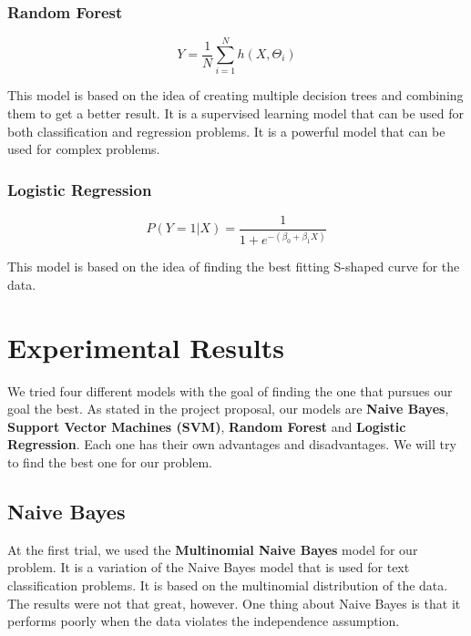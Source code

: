 \documentclass[conference]{IEEEtran}
\begin{document}
\subsubsection{Random Forest}

\begin{equation*}
    Y = \frac{1}{N} \sum_{i=1}^{N} h(X, \Theta_i)
\end{equation*}

This model is based on the idea of creating multiple decision trees and combining them to get a better result. It is a supervised learning model that can be used for both classification and regression problems. It is a powerful model that can be used for complex problems.

\subsubsection{Logistic Regression}

\begin{equation*}
    P(Y=1|X) = \frac{1}{1 + e^{-(\beta_0 + \beta_1 X)}}
\end{equation*}

This model is based on the idea of finding the best fitting S-shaped curve for the data.

\section{Experimental Results}

We tried four different models with the goal of finding the one that pursues our goal the best. As stated in the project proposal, our models are \textbf{Naive Bayes}, \textbf{Support Vector Machines (SVM)}, \textbf{Random Forest} and \textbf{Logistic Regression}. Each one has their own advantages and disadvantages. We will try to find the best one for our problem.

\subsection{Naive Bayes}

At the first trial, we used the \textbf{Multinomial Naive Bayes} model for our problem. It is a variation of the Naive Bayes model that is used for text classification problems. It is based on the multinomial distribution of the data. The results were not that great, however. One thing about Naive Bayes is that it performs poorly when the data violates the independence assumption.
\end{document}
